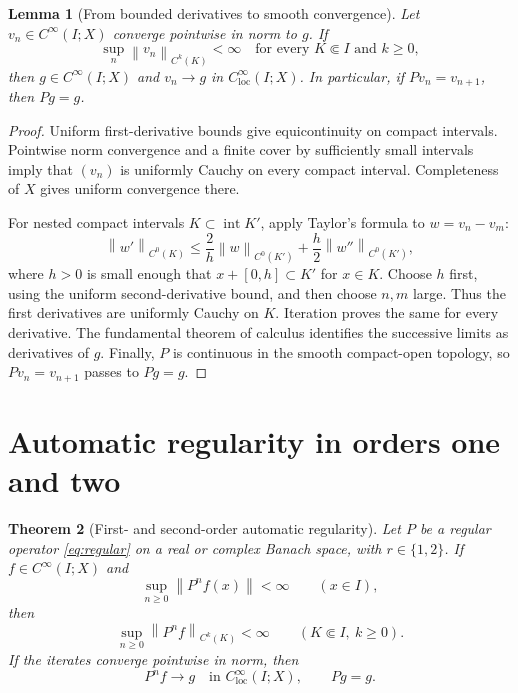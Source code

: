 \documentclass[11pt,reqno]{amsart}
\numberwithin{equation}{section}
\newtheorem{theorem}{Theorem}[section]
\newtheorem{lemma}[theorem]{Lemma}
\theoremstyle{definition}
\theoremstyle{remark}
\newcommand{\loc}{\mathrm{loc}}
\newcommand{\norm}[1]{\left\lVert #1\right\rVert}
\newcommand{\clim}{C^\infty_{\loc}}
\begin{document}
\begin{lemma}[From bounded derivatives to smooth convergence]\label{lem:convergence}
Let $v_n\in C^\infty(I;X)$ converge pointwise in norm to $g$. If
\[
 \sup_n\norm{v_n}_{C^k(K)}<\infty
 \quad\text{for every }K\Subset I\text{ and }k\ge0,
\]
then $g\in C^\infty(I;X)$ and $v_n\to g$ in $\clim(I;X)$. In particular, if $Pv_n=v_{n+1}$, then $Pg=g$.
\end{lemma}
\begin{proof}
Uniform first-derivative bounds give equicontinuity on compact intervals. Pointwise norm convergence and a finite cover by sufficiently small intervals imply that $(v_n)$ is uniformly Cauchy on every compact interval. Completeness of $X$ gives uniform convergence there.

For nested compact intervals $K\subset\operatorname{int}K'$, apply Taylor's formula to $w=v_n-v_m$:
\begin{equation}\label{eq:cauchyderiv}
 \norm{w'}_{C^0(K)}
 \le \frac{2}{h}\norm{w}_{C^0(K')}
       +\frac h2\norm{w''}_{C^0(K')},
\end{equation}
where $h>0$ is small enough that $x+[0,h]\subset K'$ for $x\in K$. Choose $h$ first, using the uniform second-derivative bound, and then choose $n,m$ large. Thus the first derivatives are uniformly Cauchy on $K$. Iteration proves the same for every derivative. The fundamental theorem of calculus identifies the successive limits as derivatives of $g$. Finally, $P$ is continuous in the smooth compact-open topology, so $Pv_n=v_{n+1}$ passes to $Pg=g$.
\end{proof}

\section{Automatic regularity in orders one and two}\label{sec:loworder}
\begin{theorem}[First- and second-order automatic regularity]\label{thm:loworder}
Let $P$ be a regular operator \eqref{eq:regular} on a real or complex Banach space, with $r\in\{1,2\}$. If $f\in C^\infty(I;X)$ and
\begin{equation}\label{eq:pointbound}
 \sup_{n\ge0}\norm{P^nf(x)}<\infty\qquad(x\in I),
\end{equation}
then
\begin{equation}\label{eq:allbounds}
 \sup_{n\ge0}\norm{P^nf}_{C^k(K)}<\infty
 \qquad(K\Subset I,\ k\ge0).
\end{equation}
If the iterates converge pointwise in norm, then
\begin{equation}\label{eq:smoothlimit}
 P^nf\longrightarrow g\quad\text{in }\clim(I;X),\qquad Pg=g.
\end{equation}
\end{theorem}
\end{document}
